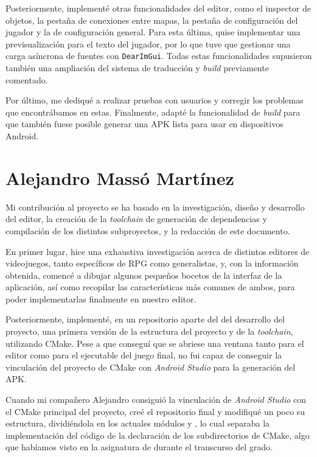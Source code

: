 Posteriormente, implementé otras funcionalidades del editor, como el inspector de objetos, la pestaña de conexiones entre mapas, la pestaña de configuración del jugador y la de configuración general. Para esta última, quise implementar una previsualización para el texto del jugador, por lo que tuve que gestionar una carga asíncrona de fuentes con \texttt{DearImGui}. Todas estas funcionalidades supusieron también una ampliación del sistema de traducción y \textit{build} previamente comentado.  

Por último, me dediqué a realizar pruebas con usuarios y corregir los problemas que encontrábamos en estas. Finalmente, adapté la funcionalidad de \textit{build} para que también fuese posible generar una APK lista para usar en dispositivos Android.

\section*{Alejandro Massó Martínez}
Mi contribución al proyecto se ha basado en la investigación, diseño y desarrollo del editor, la creación de la \textit{toolchain} de generación de dependencias y compilación de los distintos subproyectos, y la redacción de este documento.

\medskip

En primer lugar, hice una exhaustiva investigación acerca de distintos editores de videojuegos, tanto específicos de RPG como generalistas, y, con la información obtenida, comencé a dibujar algunos pequeños bocetos de la interfaz de la aplicación, así como recopilar las características más comunes de ambos, para poder implementarlas finalmente en nuestro editor.

\medskip

Posteriormente, implementé, en un repositorio aparte del del desarrollo del proyecto, una primera versión de la estructura del proyecto y de la \textit{toolchain}, utilizando CMake. Pese a que conseguí que se abriese una ventana tanto para el editor como para el ejecutable del juego final, no fui capaz de conseguir la vinculación del proyecto de CMake con \textit{Android Studio} para la generación del APK.

\medskip

Cuando mi compañero Alejandro consiguió la vinculación de \textit{Android Studio} con el CMake principal del proyecto, creé el repositorio final y modifiqué un poco su estructura, dividiéndola en los actuales módulos  y , lo cual separaba la implementación del código de la declaración de los subdirectorios de CMake, algo que habíamos visto en la asignatura de  durante el transcurso del grado.

